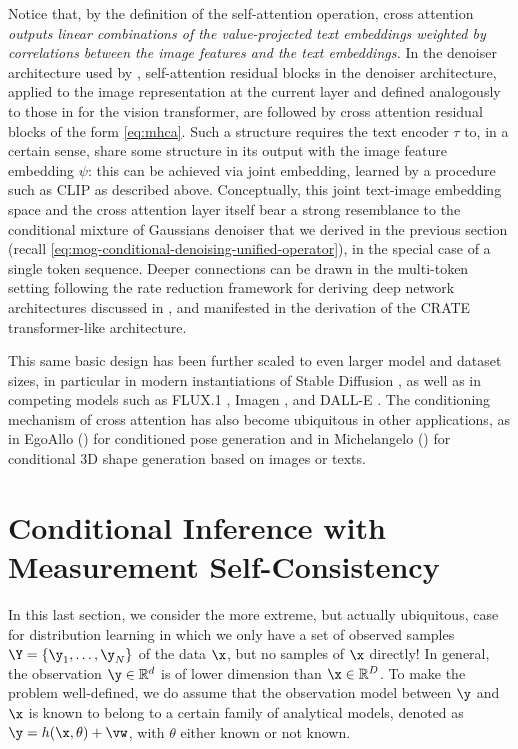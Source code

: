 \documentclass[../../book-main.tex]{subfiles}
\begin{document}
Notice that, by the definition of the self-attention operation, cross attention
\textit{outputs linear combinations of the value-projected text embeddings
weighted by correlations between the image features and the text embeddings.}
In the denoiser architecture used by \textcite{rombach2022high},
self-attention residual blocks in the denoiser architecture, applied to the
image representation at the current layer and defined analogously
to those in  for the vision transformer, are
followed by cross
attention residual blocks of the form \eqref{eq:mhca}.
Such a structure requires the text encoder $\tau$ to, in a certain
sense, share some
structure in its output with the image feature embedding $\psi$: this can be
achieved via joint
embedding, learned by a procedure such as CLIP as described above.
Conceptually, this joint text-image embedding space and the cross attention
layer itself bear a strong resemblance to the
conditional mixture of Gaussians denoiser that we derived in the previous
section (recall \eqref{eq:mog-conditional-denoising-unified-operator}), in the
special case of a single token sequence. Deeper
connections can be drawn in the multi-token setting following the rate reduction
framework for deriving deep network architectures discussed in
, and manifested in the derivation of the CRATE
transformer-like architecture.

This same basic design has been further scaled to even larger model and dataset
sizes, in particular in modern instantiations of Stable Diffusion
\cite{DBLP:conf/icml/EsserKBEMSLLSBP24}, as well as in competing models such as
FLUX.1 \cite{Labs2025-fb}, Imagen \cite{Saharia2022-na}, and DALL-E
\cite{Ramesh2022-nu}.
The conditioning mechanism of cross attention has also become ubiquitous in
other applications, as in EgoAllo () for
conditioned pose generation and in Michelangelo
() for conditional 3D shape generation based
on images or texts.

\section{Conditional Inference with Measurement Self-Consistency}
\label{sec:measurement-self-consistency}
In this last section, we consider the more extreme, but actually
ubiquitous, case for distribution learning in which we only have a
set of observed samples $\Y = \{\y_1,\ldots, \y_N\}$ of the data
$\x$, but no samples of $\x$ directly! In general, the observation
$\y \in \mathbb{R}^d$ is of lower dimension than $\x \in
\mathbb{R}^D$. To make the problem well-defined, we do assume that
the observation model between $\y$ and $\x$ is known to belong to a
certain family of analytical models, denoted as $\y = h(\x, \theta)
+\vw$, with $\theta$ either known or not known.
\end{document}
